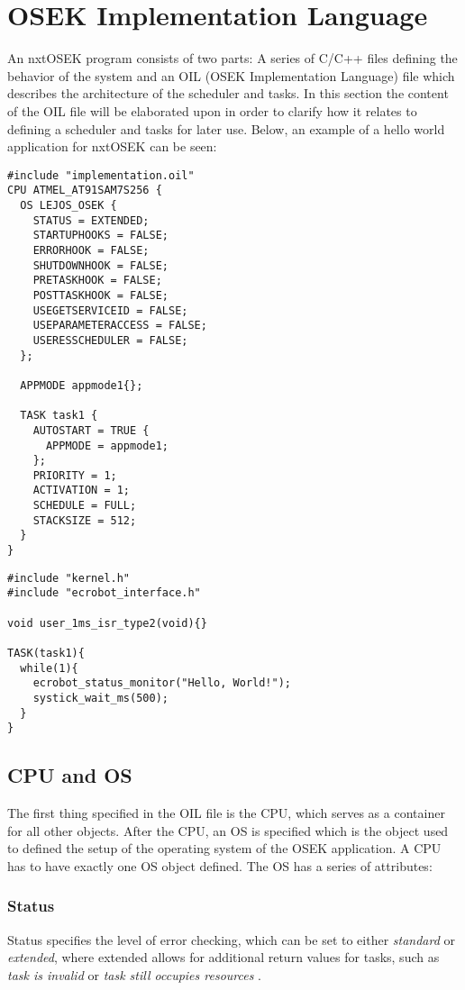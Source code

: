 
\section{OSEK Implementation Language}
An nxtOSEK program consists of two parts: A series of C/C++ files defining the behavior of the system and an OIL (OSEK Implementation Language) file which describes the architecture of the scheduler and tasks.
In this section the content of the OIL file will be elaborated upon in order to clarify how it relates to defining a scheduler and tasks for later use.
Below, an example of a hello world application for nxtOSEK can be seen:
\begin{lstlisting}[caption=OIL]
#include "implementation.oil"
CPU ATMEL_AT91SAM7S256 {
  OS LEJOS_OSEK {
    STATUS = EXTENDED;
    STARTUPHOOKS = FALSE;
    ERRORHOOK = FALSE;
    SHUTDOWNHOOK = FALSE;
    PRETASKHOOK = FALSE;
    POSTTASKHOOK = FALSE;
    USEGETSERVICEID = FALSE;
    USEPARAMETERACCESS = FALSE;
    USERESSCHEDULER = FALSE;
  };
  
  APPMODE appmode1{};

  TASK task1 {
    AUTOSTART = TRUE {
      APPMODE = appmode1;    
    };
    PRIORITY = 1;
    ACTIVATION = 1;
    SCHEDULE = FULL;
    STACKSIZE = 512;
  }
}
\end{lstlisting}

\begin{lstlisting}[caption=C source]
#include "kernel.h"
#include "ecrobot_interface.h"

void user_1ms_isr_type2(void){}

TASK(task1){
  while(1){
    ecrobot_status_monitor("Hello, World!");
    systick_wait_ms(500);
  }
}
\end{lstlisting}

\subsection{CPU and OS}
The first thing specified in the OIL file is the CPU, which serves as a container for all other objects\cite{irisa25}.
After the CPU, an OS is specified which is the object used to defined the setup of the operating system of the OSEK application.
A CPU has to have exactly one OS object defined.
The OS has a series of attributes: 
\subsubsection*{Status}
Status specifies the level of error checking, which can be set to either \textit{standard} or \textit{extended}, where extended allows for additional return values for tasks, such as \textit{task is invalid} or \textit{task still occupies resources} \cite{irisa223}.\\

